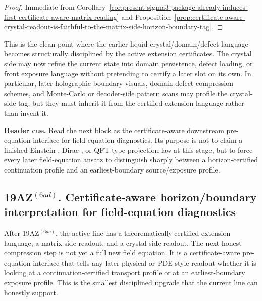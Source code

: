 \begin{proof}
Immediate from Corollary~\ref{cor:present-sigma3-package-already-induces-first-certificate-aware-matrix-reading} and Proposition~\ref{prop:certificate-aware-crystal-readout-is-faithful-to-the-matrix-side-horizon-boundary-tag}.
\end{proof}

\begin{remark}
\label{rem:what-this-crystal-reading-now-buys}
This is the clean point where the earlier liquid-crystal/domain/defect language becomes structurally disciplined by the active extension certificates. The crystal side may now refine the current state into domain persistence, defect loading, or front exposure language without pretending to certify a later slot on its own. In particular, later holographic boundary visuals, domain-defect compression schemes, and Monte-Carlo or decoder-side pattern scans may profile the crystal-side tag, but they must inherit it from the certified extension language rather than invent it.
\end{remark}

\noindent\textbf{Reader cue.} Read the next block as the certificate-aware downstream pre-equation interface for field-equation diagnostics. Its purpose is not to claim a finished Einstein-, Dirac-, or QFT-type projection law at this stage, but to force every later field-equation ansatz to distinguish sharply between a horizon-certified continuation profile and an earliest-boundary source/exposure profile.

\subsection*{19AZ$^{(6ad)}$. Certificate-aware horizon/boundary interpretation for field-equation diagnostics}
\label{sec:certificate-aware-horizon-boundary-interpretation-for-field-equation-diagnostics}
After 19AZ$^{(6ac)}$, the active line has a theorematically certified extension language, a matrix-side readout, and a crystal-side readout. The next honest compression step is not yet a full new field equation. It is a certificate-aware pre-equation interface that tells any later physical or PDE-style readout whether it is looking at a continuation-certified transport profile or at an earliest-boundary exposure profile. This is the smallest disciplined upgrade that the current line can honestly support.

